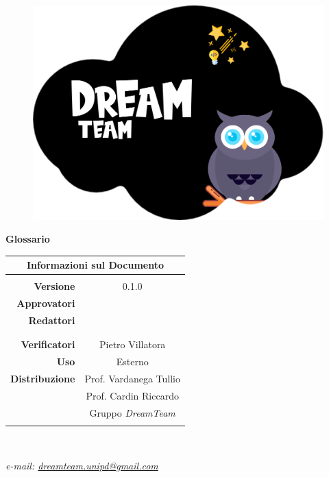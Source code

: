 
\begin{center}

\begin{figure}
\centering
\includegraphics[scale=0.05]{Sezioni/images/DreamTeam.png} 
\end{figure}

{\Huge{\textbf{Glossario}}} \\ [1cm]

\begin{table}[htbp]
\centering
\begin{tabular}{r|c}
\multicolumn{2}{c}{\textbf{Informazioni sul Documento}} \\
\hline \\
\textbf{Versione} & 0.1.0 \\ \rule{0pt}{3ex}    
\textbf{Approvatori} &  \\ \rule{0pt}{3ex}      
\textbf{Redattori} & \GC{} \\ \rule{0pt}{2ex}   
& \FP{} \\ \rule{0pt}{2ex}    
& \LW{} \\ \rule{0pt}{3ex}    
\textbf{Verificatori} & Pietro Villatora \\ \rule{0pt}{3ex}       
\textbf{Uso} & Esterno \\ \rule{0pt}{3ex}    
\textbf{Distribuzione} & Prof. Vardanega Tullio \\ \rule{0pt}{2ex}   
& Prof. Cardin Riccardo \\ \rule{0pt}{2ex}   
& Gruppo \textit{DreamTeam} \\ \rule{0pt}{0.1cm}   
\end{tabular} \\ [0.5cm]
\end{table}

\textsl{ e-mail: \href{mailto:dreamteam.unipd@gmail.com}{dreamteam.unipd@gmail.com} } \\[2cm]
\end{center}
\pagebreak
